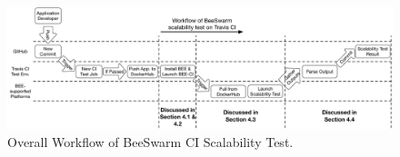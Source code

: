 \begin{figure}[h]
    \centering
    \includegraphics[width=1\textwidth]{figures/CI-workflow.pdf}
    \caption{Overall Workflow of BeeSwarm CI Scalability Test. 
    }
    \label{overall}
\end{figure}